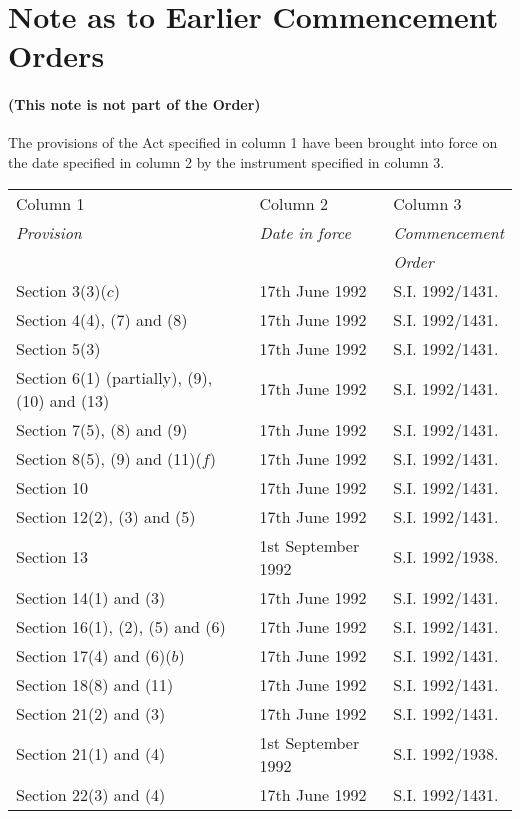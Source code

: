 \documentclass[a4paper]{article}
\newcommand{\parthead}{}
\begin{document}
\part{Note as to Earlier Commencement Orders}

\renewcommand\parthead{--- Note as to Earlier Commencement Orders}

\subsection*{(This note is not part of the Order)}

 The provisions of the Act specified in column 1 have been brought into force on the date specified in column 2 by the instrument specified in column 3.
\begin{longtable}{p{134pt}p{100pt}p{75pt}}
\hline
Column 1 & Column 2 & Column 3\\
\itshape Provision & \itshape Date in force & \itshape Commencement\\
&&\itshape Order\\
\hline
\endhead
\hline
\endlastfoot
Section 3(3)($c$)&17th June 1992&S.I. 1992/1431.\\
Section 4(4), (7) and (8)&17th June 1992&S.I. 1992/1431.\\
Section 5(3)&17th June 1992&S.I. 1992/1431.\\
Section 6(1) (partially), (9), (10) and (13)&17th June 1992&S.I. 1992/1431.\\
Section 7(5), (8) and (9)&17th June 1992&S.I. 1992/1431.\\
Section 8(5), (9) and (11)($f$)&17th June 1992&S.I. 1992/1431.\\
Section 10&17th June 1992&S.I. 1992/1431.\\
Section 12(2), (3) and (5)&17th June 1992&S.I. 1992/1431.\\
Section 13&1st September 1992&S.I. 1992/1938.\\
Section 14(1) and (3)&17th June 1992&S.I. 1992/1431.\\
Section 16(1), (2), (5) and (6)&17th June 1992&S.I. 1992/1431.\\
Section 17(4) and (6)($b$)&17th June 1992&S.I. 1992/1431.\\
Section 18(8) and (11)&17th June 1992&S.I. 1992/1431.\\
Section 21(2) and (3)&17th June 1992&S.I. 1992/1431.\\
Section 21(1) and (4)&1st September 1992&S.I. 1992/1938.\\
Section 22(3) and (4)&17th June 1992&S.I. 1992/1431.\\

\end{longtable}
\end{document}
